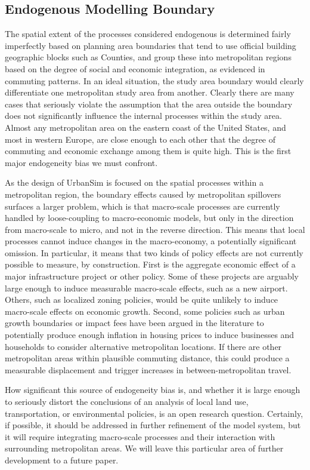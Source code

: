 \documentclass[12pt,a4paper]{article}
\begin{document}
\subsection{Endogenous Modelling Boundary}
The spatial extent of the processes considered endogenous is
determined fairly imperfectly based on planning area boundaries
that tend to use official building geographic blocks such as
Counties, and group these into metropolitan regions based on the
degree of social and economic integration, as evidenced in
commuting patterns.  In an ideal situation, the study area
boundary would clearly differentiate one metropolitan study area
from another.  Clearly there are many cases that seriously violate
the assumption that the area outside the boundary does not
significantly influence the internal processes within the study
area.  Almost any metropolitan area on the eastern coast of the
United States, and most in western Europe, are close enough to
each other that the degree of commuting and economic exchange
among them is quite high.  This is the first major endogeneity
bias we must confront.

As the design of UrbanSim is focused on the spatial processes
within a metropolitan region, the boundary effects caused by
metropolitan spillovers surfaces a larger problem, which is that
macro-scale processes are currently handled by loose-coupling to
macro-economic models, but only in the direction from macro-scale
to micro, and not in the reverse direction. This means that local
processes cannot induce changes in the macro-economy, a
potentially significant omission. In particular, it means that two
kinds of policy effects are not currently possible to measure, by
construction.  First is the aggregate economic effect of a major
infrastructure project or other policy. Some of these projects are
arguably large enough to induce measurable macro-scale effects,
such as a new airport. Others, such as localized zoning policies,
would be quite unlikely to induce macro-scale effects on economic
growth.  Second, some policies such as urban growth boundaries or
impact fees have been argued in the literature to potentially
produce enough inflation in housing prices to induce businesses
and households to consider alternative metropolitan locations.  If
there are other metropolitan areas within plausible commuting
distance, this could produce a measurable displacement and trigger
increases in between-metropolitan travel.

How significant this source of endogeneity bias is, and whether it
is large enough to seriously distort the conclusions of an
analysis of local land use, transportation, or environmental
policies, is an open research question.  Certainly, if possible,
it should be addressed in further refinement of the model system,
but it will require integrating macro-scale processes and their
interaction with surrounding metropolitan areas.  We will leave
this particular area of further development to a future paper.
\end{document}
